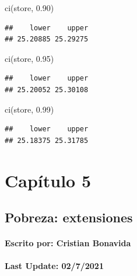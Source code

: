 \documentclass[
]{book}
\newenvironment{Shaded}{\begin{snugshade}}{\end{snugshade}}
\newcommand{\FloatTok}[1]{\textcolor[rgb]{0.00,0.00,0.81}{#1}}
\newcommand{\FunctionTok}[1]{\textcolor[rgb]{0.00,0.00,0.00}{#1}}
\newcommand{\NormalTok}[1]{#1}
\begin{document}
\begin{Shaded}
\begin{Highlighting}[]
\FunctionTok{ci}\NormalTok{(store, }\FloatTok{0.90}\NormalTok{)}
\end{Highlighting}
\end{Shaded}

\begin{verbatim}
##    lower    upper 
## 25.20885 25.29275
\end{verbatim}

\begin{Shaded}
\begin{Highlighting}[]
\FunctionTok{ci}\NormalTok{(store, }\FloatTok{0.95}\NormalTok{)}
\end{Highlighting}
\end{Shaded}

\begin{verbatim}
##    lower    upper 
## 25.20052 25.30108
\end{verbatim}

\begin{Shaded}
\begin{Highlighting}[]
\FunctionTok{ci}\NormalTok{(store, }\FloatTok{0.99}\NormalTok{)}
\end{Highlighting}
\end{Shaded}

\begin{verbatim}
##    lower    upper 
## 25.18375 25.31785
\end{verbatim}

\hypertarget{capuxedtulo-5}{%
\chapter{Capítulo 5}\label{capuxedtulo-5}}

\hypertarget{pobreza-extensiones}{%
\section*{Pobreza: extensiones}\label{pobreza-extensiones}}

\hypertarget{escrito-por-cristian-bonavida-3}{%
\subsubsection*{Escrito por: Cristian Bonavida}\label{escrito-por-cristian-bonavida-3}}

\hypertarget{last-update-0272021-2}{%
\subsubsection*{Last Update: 02/7/2021}\label{last-update-0272021-2}}
\end{document}

